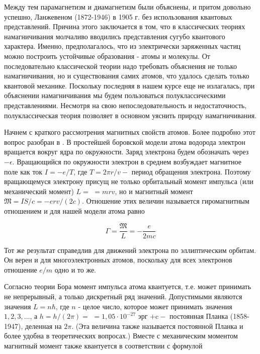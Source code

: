 \documentclass[12pt]{article}
\begin{document}
  Между тем парамагнетизм и диамагнетизм были объяснены, и притом довольно успешно, Ланжевеном (1872-1946) в 1905 г. без использования квантовых представлений. Причина этого заключается в том, что в классических теориях намагничивания молчаливо вводились представления сугубо квантового характера. Именно, предполагалось, что из электрически заряженных частиц можно построить устойчивые образования - атомы и молекулы. От последовательно классической теории надо требовать объяснения не только намагничивания, но и существования самих атомов, что удалось сделать только квантовой механике. Поскольку последняя в нашем курсе еще не излагалась, при объяснении намагничивания мы будем пользоваться полуклассическими представлениями. Несмотря на свою непоследовательность и недостаточность, полуклассическая теория позволяет в основном уяснить природу намагничивания.

  Начнем с краткого рассмотрения магнитных свойств атомов. Более подробно этот вопрос разобран в \cite{sivykhin5}. В простейшей боровской модели атома водорода электрон вращается вокруг ядра по окружности. Заряд электрона будем обозначать через $-\epsilon$. Вращающийся по окружности электрон в среднем возбуждает магнитное поле как ток $I=-e / T$, где $T=2 \pi r / v-$ период обращения электрона. Поэтому вращающемуся электрону присущ не только орбитальный момент импульса (или механический момент) $L=$ $=m r v$, но и магнитный момент $\mathfrak{M}=I S / c=-e r v /(2 c)$. Отношение этих величин называется гиромагнитным отношением и для нашей модели атома равно

  \begin{equation}
    \label{eq:intro}
    \Gamma=\frac{\mathfrak{M}}{L}=-\frac{e}{2 m c}
  \end{equation}


  Тот же результат справедлив для движений электрона по эллиптическим орбитам. Он верен и для многоэлектронных атомов, поскольку для всех электронов отношение $e / m$ одно и то же.

  Согласно теории Бора момент импульса атома квантуется, т.е. может принимать не непрерывный, а только дискретный ряд значений. Допустимыми являются значения $L=n \hbar$, где $n$ - целое число, которое может принимать значения $1,2,3, \ldots$, а $h=h /(2 \pi)=$ $=1,05 \cdot 10^{-27}$ эрг $+\mathrm{c}-$ постоянная Планка (1858-1947), деленная на $2 \pi$. (Эта величина также называется постоянной Планка и более удобна в теоретических вопросах.) Вместе с механическим моментом магнитный момент также квантуется в соответствии с формулой
\end{document}
